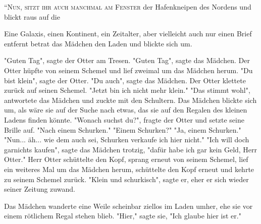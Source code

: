 

\lettrine{``N}{un, sitzt ihr auch manchmal am Fenster} der Hafenkneipen des Nordens und blickt raus auf die

Eine Galaxis, einen Kontinent, ein Zeitalter, aber vielleicht auch nur einen Brief entfernt betrat das Mädchen den Laden und blickte sich um.

"Guten Tag", sagte der Otter am Tresen.
"Guten Tag", sagte das Mädchen.
Der Otter hüpfte von seinem Schemel und lief zweimal um das Mädchen herum.
"Du bist klein", sagte der Otter.
"Du auch", sagte das Mädchen.
Der Otter klettete zurück auf seinen Schemel.
"Jetzt bin ich nicht mehr klein."
"Das stimmt wohl", antwortete das Mädchen und zuckte mit den Schultern.
Das Mädchen blickte sich um, als wäre sie auf der Suche nach etwas, das sie auf den Regalen des kleinen Ladens finden könnte.
"Wonach suchst du?", fragte der Otter und setzte seine Brille auf.
"Nach einem Schurken."
"Einem Schurken?"
"Ja, einem Schurken."
"Nun... äh... wie dem auch sei, Schurken verkaufe ich hier nicht."
"Ich will doch garnichts kaufen", sagte das Mädchen trotzig, "dafür habe ich gar kein Geld, Herr Otter."
Herr Otter schüttelte den Kopf, sprang erneut von seinem Schemel, lief ein weiteres Mal um das Mädchen herum, schüttelte den Kopf erneut und kehrte zu seinem Schemel zurück. "Klein und schurkisch", sagte er, eher er sich wieder seiner Zeitung zuwand. 

Das Mädchen wanderte eine Weile scheinbar ziellos im Laden umher, ehe sie vor einem rötlichem Regal stehen blieb. 
"Hier," sagte sie, "Ich glaube hier ist er."